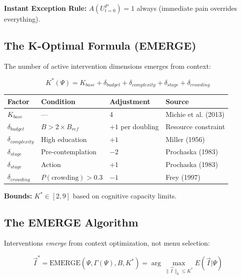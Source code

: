 \textbf{Instant Exception Rule:} $A(U^{P}_{t=0}) = 1$ always (immediate pain overrides everything).

\subsection{The K-Optimal Formula (EMERGE)}

The number of active intervention dimensions emerges from context:

\begin{equation}
\boxed{
K^*(\Psi) = K_{base} + \delta_{budget} + \delta_{complexity} + \delta_{stage} + \delta_{crowding}
}
\label{eq:mp-k-optimal}
\end{equation}

\begin{center}
\renewcommand{\arraystretch}{1.2}
\small
\begin{tabular}{@{}llll@{}}
\toprule
\textbf{Factor} & \textbf{Condition} & \textbf{Adjustment} & \textbf{Source} \\
\midrule
$K_{base}$ & --- & 4 & Michie et al. (2013) \\
$\delta_{budget}$ & $B > 2 \times B_{ref}$ & $+1$ per doubling & Resource constraint \\
$\delta_{complexity}$ & High education & $+1$ & Miller (1956) \\
$\delta_{stage}$ & Pre-contemplation & $-2$ & Prochaska (1983) \\
$\delta_{stage}$ & Action & $+1$ & Prochaska (1983) \\
$\delta_{crowding}$ & $P(\text{crowding}) > 0.3$ & $-1$ & Frey (1997) \\
\bottomrule
\end{tabular}
\end{center}

\textbf{Bounds:} $K^* \in [2, 9]$ based on cognitive capacity limits.

\subsection{The EMERGE Algorithm}

Interventions \emph{emerge} from context optimization, not menu selection:

\begin{equation}
\boxed{
\vec{I}^* = \text{EMERGE}(\Psi, \Gamma(\Psi), B, K^*) = \arg\max_{\|\vec{I}\|_0 \leq K^*} E(\vec{I} | \Psi)
}
\label{eq:mp-emerge}
\end{equation}

